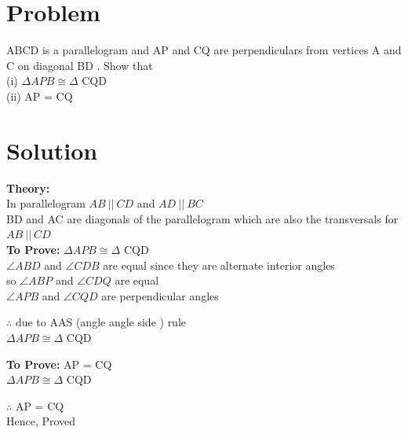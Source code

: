 \documentclass[10pt, a4paper]{article}
\title{\mytitle}
\author{\myauthor\hspace{1em}\\\contact\\FWC22012\hspace{6.5em}IITH\hspace{0.5em}\mymodule\hspace{6em}ASSIGN-5}
\date{}
\begin{document}
	\maketitle
	\tableofcontents
   \section{Problem}
  ABCD is a parallelogram and AP and CQ are
perpendiculars from vertices A and C on diagonal
BD . Show that \\
(i) $\Delta APB \cong \Delta$ CQD \\       
(ii) AP = CQ

   \section{Solution}
   \textbf{Theory:}\\
In parallelogram $ AB\: || \: CD$ and $ AD\: || \: BC$  \\
BD and AC are diagonals of the parallelogram which are also the transversals for $ AB\: || \: CD$\\
\textbf{To Prove:} $\Delta APB \cong\Delta$ CQD \\
$\angle {ABD}$ and $\angle {CDB}$ are equal since they are alternate interior angles\\
so $\angle {ABP}$ and $\angle {CDQ}$ are equal\\
$\angle {APB}$ and $\angle {CQD}$ are perpendicular angles\\

\begin{center}
$\therefore$ due to AAS (angle angle side ) rule\\
$\Delta APB \cong\Delta$ CQD   
\end{center}
\textbf{To Prove:}  AP = CQ\\
$\Delta APB \cong \Delta$ CQD   
\begin{center}
$\therefore$ AP = CQ    \\
Hence, Proved \\
\
\\
\end{center}
\end{document}
